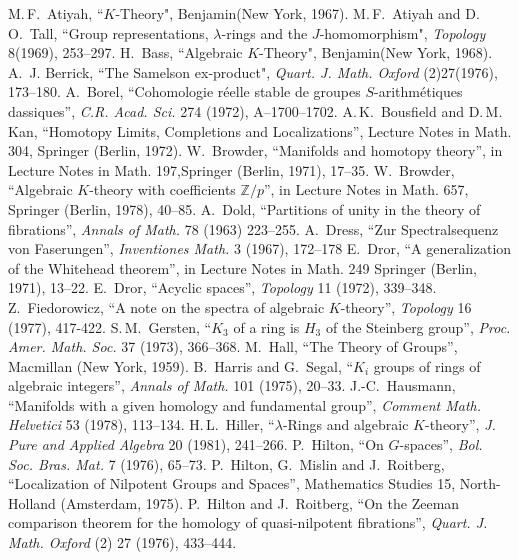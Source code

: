 \documentclass[openany,leqno]{book}  %
\newcommand{\Z}{\mathbb{Z}}
\begin{document}
\begin{thebibliography}{99}
 M.\,F.~Atiyah, ``$K$-Theory", Benjamin(New York, 1967).
 M.\,F.~Atiyah and D.\,O.~Tall, ``Group representations, $\lambda$-rings and the $J$-homomorphism",  {\em Topology} 8(1969), 253--297.
 H.~Bass, ``Algebraic $K$-Theory", Benjamin(New York, 1968).
 A.~J. Berrick, ``The Samelson ex-product", {\em Quart. J. Math. Oxford} (2)27(1976), 173--180.
 A.~Borel, ``Cohomologie r\'eelle stable de groupes $S$-arithm\'etiques dassiques'', {\em C.R. Acad. Sci.} 274 (1972), A--1700--1702. 
A.\,K.~Bousfield and D.\,M.~ Kan, ``Homotopy Limits, Completions and Localizations'', Lecture Notes in Math. 304, Springer (Berlin, 1972).
 W.~Browder, ``Manifolds and homotopy theory'', in Lecture Notes in Math. 197,Springer (Berlin, 1971), 17--35.
 W.~Browder, ``Algebraic $K$-theory with coefficients $\Z/p$'', in Lecture Notes in Math. 657, Springer (Berlin, 1978), 40--85.
 A.~Dold, ``Partitions of unity in the theory of fibrations'', {\em Annals of Math.} 78 (1963) 223--255.
 A.~Dress, ``Zur Spectralsequenz von Faserungen'', {\em Inventiones Math.} 3 (1967), 172--178
 E.~Dror, ``A generalization of the Whitehead theorem'', in Lecture Notes in Math. 249 Springer (Berlin, 1971), 13--22.
 E.~Dror, ``Acyclic spaces'', {\em Topology} 11 (1972), 339--348.
 Z.~Fiedorowicz, ``A note on the spectra of algebraic $K$-theory'', {\em Topology} 16 (1977), 417-422.
 S.\,M.~Gersten, ``$K_3$ of a ring is $H_3$ of the Steinberg group'', {\em Proc. Amer. Math. Soc.} 37 (1973), 366--368.
 M.~Hall, ``The Theory of Groups'', Macmillan (New York, 1959).
 B.~Harris and G.~Segal, ``$K_i$ groups of rings of algebraic integers'', {\em Annals of Math.} 101 (1975), 20--33.
 J.-C.~Hausmann, ``Manifolds with a given homology and fundamental group'', {\em Comment Math. Helvetici} 53 (1978), 113--134.
 H.\,L.~Hiller, ``$\lambda$-Rings and algebraic $K$-theory'', {\em J. Pure and Applied Algebra} 20 (1981), 241--266.
 P.~Hilton, ``On $G$-spaces'', {\em Bol. Soc. Bras. Mat.} 7 (1976), 65--73.
 P.~Hilton, G.~Mislin and J.~Roitberg, ``Localization of Nilpotent Groups and Spaces'', Mathematics Studies 15, North-Holland (Amsterdam, 1975).
 P.~Hilton and J.~Roitberg, ``On the Zeeman comparison theorem for the homology of quasi-nilpotent fibrations'', {\em Quart. J. Math. Oxford} (2) 27 (1976), 433--444.

\end{thebibliography}
\end{document}
